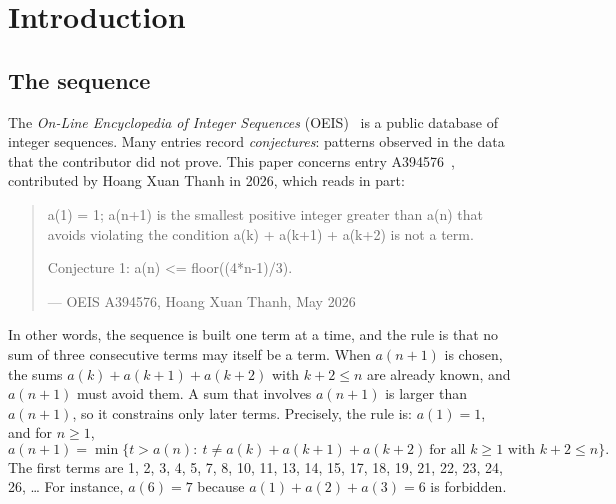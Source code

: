 \documentclass[11pt,a4paper]{article}
\theoremstyle{definition}
\theoremstyle{remark}
\begin{document}
\section{Introduction}

\subsection{The sequence}\label{sec:sequence}
The \emph{On-Line Encyclopedia of Integer Sequences} (OEIS)~\cite{oeisdb} is a public database of integer sequences.
Many entries record \emph{conjectures}: patterns observed in the data that the contributor did not prove. This paper
concerns entry A394576~\cite{oeis}, contributed by Hoang Xuan Thanh in 2026, which reads in part:
\begin{quote}\small\ttfamily\raggedright a(1) = 1; a(n+1) is the smallest positive integer greater than a(n) that avoids violating the condition a(k) + a(k+1) + a(k+2) is not a term.\par\smallskip Conjecture 1: a(n) <= floor((4*n-1)/3).\par\smallskip\hfill\textrm{--- OEIS A394576, Hoang Xuan Thanh, May 2026}\end{quote}

In other words, the sequence is built one term at a time, and the rule is that no sum of three consecutive terms may itself be
a term. When $a(n+1)$ is chosen, the sums $a(k)+a(k+1)+a(k+2)$ with $k+2\le n$ are already known, and $a(n+1)$ must avoid
them. A sum that involves $a(n+1)$ is larger than $a(n+1)$, so it constrains only later terms.
Precisely, the rule is: $a(1)=1$, and for $n\ge1$,
\begin{equation}\label{eq:rule}
a(n+1)=\min\bigl\{t>a(n):\ t\ne a(k)+a(k+1)+a(k+2)\ \text{for all }k\ge1\text{ with }k+2\le n\bigr\}.
\end{equation}
The first terms are 1, 2, 3, 4, 5, 7, 8, 10, 11, 13, 14, 15, 17, 18, 19, 21, 22, 23, 24, 26, \dots{} For instance, $a(6)=7$ because
$a(1)+a(2)+a(3)=6$ is forbidden.
\end{document}
